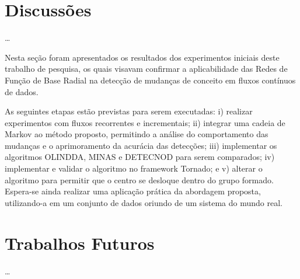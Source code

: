 \documentclass[msc, classic, a4paper]{ufbathesis}
\begin{document}
 \label{conclusoes_e_trabalhos_futuros}

\section{Discussões}

\ldots

Nesta seção foram apresentados os resultados dos experimentos iniciais deste trabalho de pesquisa,
os quais visavam confirmar a aplicabilidade das Redes de Função de Base Radial na detecção de mudanças de conceito em fluxos contínuos de dados.

As seguintes etapas estão previstas para serem executadas:
i) realizar experimentos com fluxos recorrentes e incrementais;
ii) integrar uma cadeia de Markov ao método proposto, permitindo a análise do comportamento das mudanças e o aprimoramento da acurácia das detecções;
iii) implementar os algoritmos OLINDDA, MINAS e DETECNOD para serem comparados;
iv) implementar e validar o algoritmo no framework Tornado; e
v) alterar o algoritmo para permitir que o centro se desloque dentro do grupo formado.
Espera-se ainda realizar uma aplicação prática da abordagem proposta, utilizando-a em um conjunto de dados oriundo de um sistema do mundo real.

\section{Trabalhos Futuros}

\ldots

\backmatter





%
% 
% 

\end{document}
